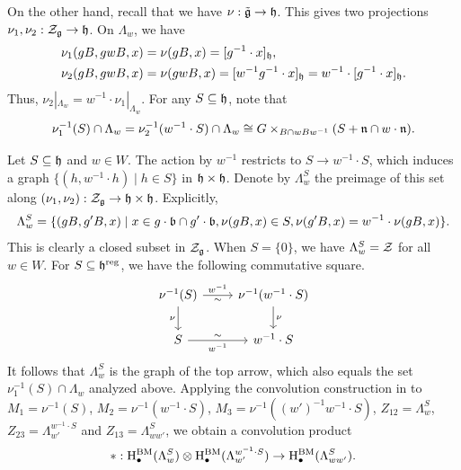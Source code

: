 On the other hand, recall that we have $\nu : \tilde{\mathfrak{g}} \to \mathfrak{h}$. This gives two projections $\nu_1, \nu_2 : \mathcal{Z}_{\mathfrak{g}} \to \mathfrak{h}$. On $\Lambda_w$, we have
\begin{align*}
    \nu_1(gB, gwB, x) &= \nu(gB, x) = [g^{-1} \cdot x]_{\mathfrak{h}}, \\
    \nu_2(gB, gwB, x) &= \nu(gwB, x) = [w^{-1}g^{-1} \cdot x]_{\mathfrak{h}} = w^{-1} \cdot [g^{-1} \cdot x]_{\mathfrak{h}}.
\end{align*}
Thus, $\nu_2|_{\Lambda_w} = w^{-1} \cdot \nu_1|_{\Lambda_w}$. For any $S \subseteq \mathfrak{h}$, note that
\begin{equation*}
    \nu_1^{-1}(S) \cap \Lambda_w = \nu_2^{-1}(w^{-1} \cdot S) \cap \Lambda_w \cong G \times_{B \cap wBw^{-1}} (S + \mathfrak{n} \cap w \cdot \mathfrak{n}).
\end{equation*}

Let $S \subseteq \mathfrak{h}$ and $w \in W$. The action by $w^{-1}$ restricts to $S \to w^{-1} \cdot S$, which induces a graph $\{ (h, w^{-1} \cdot h) \mid h \in S \}$ in $\mathfrak{h} \times \mathfrak{h}$. Denote by $\Lambda_w^S$ the preimage of this set along $(\nu_1, \nu_2) : \mathcal{Z}_{\mathfrak{g}} \to \mathfrak{h} \times \mathfrak{h}$. Explicitly,
\begin{equation*}
    \Lambda_w^S = \{ (gB, g'B, x) \mid x \in g \cdot \mathfrak{b} \cap g' \cdot \mathfrak{b}, \nu(gB, x) \in S, \nu(g'B, x) = w^{-1} \cdot \nu(gB, x) \}.
\end{equation*}
This is clearly a closed subset in $\mathcal{Z}_{\mathfrak{g}}$. When $S = \{ 0 \}$, we have $\Lambda_w^S = \mathcal{Z}$ for all $w \in W$. For $S \subseteq \mathfrak{h}^\mathrm{reg}$, we have the following commutative square.
\begin{equation*}
    \begin{tikzcd}
        \nu^{-1}(S) \arrow[r, "{w^{-1}}", "\sim"'] \arrow[d, "\nu"'] & \nu^{-1}(w^{-1} \cdot S) \arrow[d, "\nu"] \\
        S \arrow[r, "{w^{-1}}"', "\sim"] & w^{-1} \cdot S
    \end{tikzcd}
\end{equation*}
It follows that $\Lambda_w^S$ is the graph of the top arrow, which also equals the set $\nu_1^{-1}(S) \cap \Lambda_w$ analyzed above. Applying the convolution construction in  to $M_1 = \nu^{-1}(S)$, $M_2 = \nu^{-1}(w^{-1} \cdot S)$, $M_3 = \nu^{-1}((w')^{-1}w^{-1} \cdot S)$, $Z_{12} = \Lambda_w^S$, $Z_{23} = \Lambda_{w'}^{w^{-1} \cdot S}$ and $Z_{13} = \Lambda_{ww'}^S$, we obtain a convolution product
\begin{equation*}
    {*} : \mathrm{H}^\mathrm{BM}_\bullet(\Lambda_w^S) \otimes \mathrm{H}^\mathrm{BM}_\bullet(\Lambda_{w'}^{w^{-1} \cdot S}) \to \mathrm{H}^\mathrm{BM}_\bullet(\Lambda_{ww'}^S).
\end{equation*}

